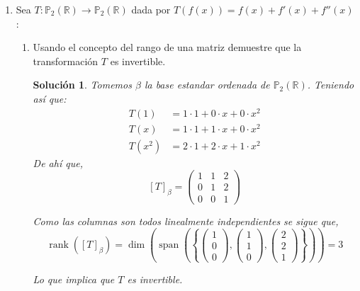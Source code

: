 \documentclass[letterpaper]{article}
\newcommand{\R}{\mathbb{R}}
\newcommand{\Po}{\mathds{P}}
\DeclareMathOperator{\rank}{rank}
\DeclareMathOperator{\Span}{span}
\newtheorem*{sol}{Solución}
\begin{document}
\begin{enumerate}
\item Sea $T : \Po_2(\R) \to \Po_2(\R)$ dada por $T(f(x)) = f(x) + f'(x) + f''(x)$:
\begin{enumerate}[label=(\alph*)]
    \item Usando el concepto del rango de una matriz demuestre que la transformación $T$ es invertible.
    \begin{sol}
    Tomemos $\beta$ la base estandar ordenada de $\Po_2(\R)$. Teniendo así que:
    \begin{align*}
        T(1) &= 1 \cdot 1 + 0 \cdot x + 0 \cdot x^2\\
        T(x) &= 1 \cdot 1 + 1 \cdot x + 0 \cdot x^2\\
        T(x^2) &= 2 \cdot 1 + 2 \cdot x + 1 \cdot x^2
    \end{align*}
    De ahí que,
    \[
        [T]_\beta =
        \begin{pmatrix}
            1 & 1 & 2 \\ 
            0 & 1 & 2 \\ 
            0 & 0 & 1
        \end{pmatrix}
    \]
    
    Como las columnas son todos linealmente independientes se sigue que,
    \[
        \rank([T]_\beta) = \dim\left(
            \Span\left(
                \left\{
                    \begin{pmatrix}
                        1\\ 
                        0\\ 
                        0
                    \end{pmatrix},
                    \begin{pmatrix}
                        1\\ 
                        1\\ 
                        0
                    \end{pmatrix},
                    \begin{pmatrix}
                        2\\ 
                        2\\ 
                        1
                    \end{pmatrix}
                \right\}
            \right)
            \right) = 3
            \]
            
            Lo que implica que $T$ es invertible.
    \end{sol}


\end{enumerate}
\end{enumerate}
\end{document}
